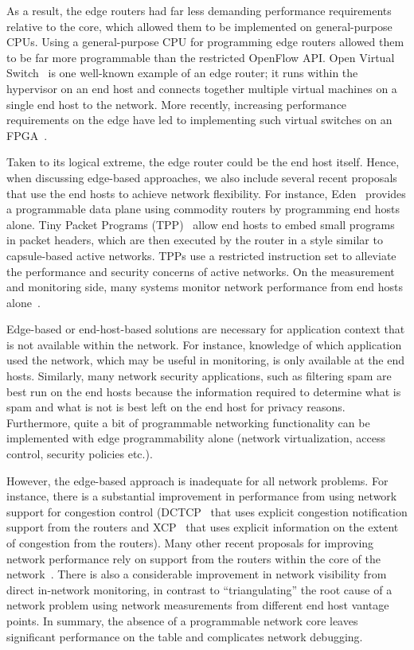 As a result, the edge routers had far less demanding performance requirements
relative to the core, which allowed them to be implemented on general-purpose
CPUs.  Using a general-purpose CPU for programming edge routers allowed them to
be far more programmable than the restricted OpenFlow API. Open Virtual Switch~\cite{openvswitch} is one well-known example
of an edge router; it runs within the hypervisor on an end host and connects
together multiple virtual machines on a single end host to the network.  More
recently, increasing performance requirements on the edge have led to
implementing such virtual switches on an FPGA~\cite{daniel_firestone_nsdi}.

Taken to its logical extreme, the edge router could be the end host itself.
Hence, when discussing edge-based approaches, we also include several recent
proposals that use the end hosts to achieve network flexibility. For instance,
Eden~\cite{eden} provides a programmable data plane using commodity routers by
programming end hosts alone.  Tiny Packet Programs (TPP)~\cite{tpp} allow end
hosts to embed small programs in packet headers, which are then executed by the
router in a style similar to capsule-based active networks. TPPs use a
restricted instruction set to alleviate the performance and security concerns
of active networks. On the measurement and monitoring side, many
systems monitor network performance from end hosts alone~\cite{netpoirot,
minlan-snap, dapper-sosr, trumpet, azure-smartnic}.

Edge-based or end-host-based solutions are necessary for application context
that is not available within the network. For instance, knowledge of which
application used the network, which may be useful in monitoring, is only
available at the end hosts.  Similarly, many network security applications,
such as filtering spam are best run on the end hosts because the information
required to determine what is spam and what is not is best left on the end host
for privacy reasons. Furthermore, quite a bit of programmable networking
functionality can be implemented with edge programmability alone
 (\eg network virtualization, access control, security policies etc.).

However, the edge-based approach is inadequate for all network problems. For
instance, there is a substantial improvement in performance from using network
support for congestion control (\eg DCTCP~\cite{dctcp} that uses explicit
congestion notification support from the routers and XCP~\cite{xcp} that uses
explicit information on the extent of congestion from the routers). Many other
recent proposals for improving network performance rely on support from the
routers within the core of the network~\cite{pFabric, pias, d3, rcp, detail,
conga, letflow}. There is also a considerable improvement in network visibility
from direct in-network monitoring, in contrast to ``triangulating'' the root cause of a
network problem using network measurements from different end host vantage
points.  In summary, the absence of a programmable network core leaves
significant performance on the table and complicates network debugging.

